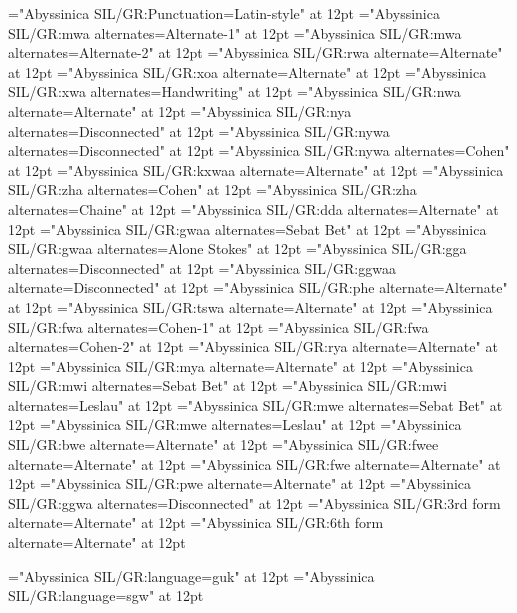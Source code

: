 \font\one="Abyssinica SIL/GR:Punctuation=Latin-style" at 12pt
\font\fourone="Abyssinica SIL/GR:mwa alternates=Alternate-1" at 12pt
\font\fourtwo="Abyssinica SIL/GR:mwa alternates=Alternate-2" at 12pt 
\font\five="Abyssinica SIL/GR:rwa alternate=Alternate" at 12pt
\font\seventeen="Abyssinica SIL/GR:xoa alternate=Alternate" at 12pt 
\font\eighteen="Abyssinica SIL/GR:xwa alternates=Handwriting" at 12pt 
\font\nineteen="Abyssinica SIL/GR:nwa alternate=Alternate" at 12pt
\font\twenty="Abyssinica SIL/GR:nya alternates=Disconnected" at 12pt 
\font\twentyoneone="Abyssinica SIL/GR:nywa alternates=Disconnected" at 12pt
\font\twentyonetwo="Abyssinica SIL/GR:nywa alternates=Cohen" at 12pt 
\font\twentysix="Abyssinica SIL/GR:kxwaa alternate=Alternate" at 12pt
\font\thirtyoneone="Abyssinica SIL/GR:zha alternates=Cohen" at 12pt
\font\thirtyonetwo="Abyssinica SIL/GR:zha alternates=Chaine" at 12pt 
\font\thirtytwo="Abyssinica SIL/GR:dda alternates=Alternate" at 12pt
\font\fortyone="Abyssinica SIL/GR:gwaa alternates=Sebat Bet" at 12pt
\font\fortytwo="Abyssinica SIL/GR:gwaa alternates=Alone Stokes" at 12pt 
\font\fortyoneone="Abyssinica SIL/GR:gga alternates=Disconnected" at 12pt
\font\fortytwoone="Abyssinica SIL/GR:ggwaa alternate=Disconnected" at 12pt
\font\fortyfive="Abyssinica SIL/GR:phe alternate=Alternate" at 12pt
\font\fortysix="Abyssinica SIL/GR:tswa alternate=Alternate" at 12pt
\font\fortyeightone="Abyssinica SIL/GR:fwa alternates=Cohen-1" at 12pt
\font\fortyeighttwo="Abyssinica SIL/GR:fwa alternates=Cohen-2" at 12pt 
\font\fortynine="Abyssinica SIL/GR:rya alternate=Alternate" at 12pt
\font\fifty="Abyssinica SIL/GR:mya alternate=Alternate" at 12pt
\font\sixtyone="Abyssinica SIL/GR:mwi alternates=Sebat Bet" at 12pt
\font\sixtytwo="Abyssinica SIL/GR:mwi alternates=Leslau" at 12pt 
\font\sixtyoneone="Abyssinica SIL/GR:mwe alternates=Sebat Bet" at 12pt
\font\sixtyonetwo="Abyssinica SIL/GR:mwe alternates=Leslau" at 12pt 
\font\sixtytwoone="Abyssinica SIL/GR:bwe alternate=Alternate" at 12pt
\font\sixtythree="Abyssinica SIL/GR:fwee alternate=Alternate" at 12pt
\font\sixtyfour="Abyssinica SIL/GR:fwe alternate=Alternate" at 12pt
\font\sixtyfive="Abyssinica SIL/GR:pwe alternate=Alternate" at 12pt 
\font\seventy="Abyssinica SIL/GR:ggwa alternates=Disconnected" at 12pt
\font\eighty="Abyssinica SIL/GR:3rd form alternate=Alternate" at 12pt
\font\eightyfive="Abyssinica SIL/GR:6th form alternate=Alternate" at 12pt

\font\guk="Abyssinica SIL/GR:language=guk" at 12pt
\font\sgw="Abyssinica SIL/GR:language=sgw" at 12pt

